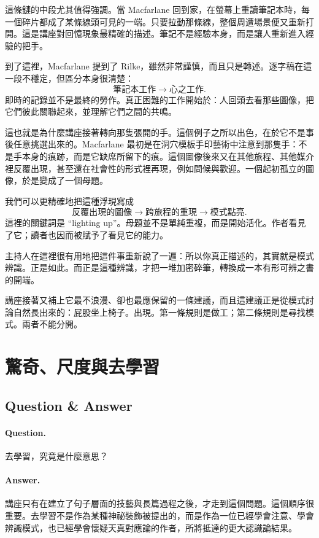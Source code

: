這條鏈的中段尤其值得強調。當 Macfarlane 回到家，在螢幕上重讀筆記本時，每一個碎片都成了某條線頭可見的一端。只要拉動那條線，整個周遭場景便又重新打開。這是講座對回憶現象最精確的描述。筆記不是經驗本身，而是讓人重新進入經驗的把手。

到了這裡，Macfarlane 提到了 Rilke，雖然非常謹慎，而且只是轉述。逐字稿在這一段不穩定，但區分本身很清楚：
\begin{equation}
\text{筆記本工作} \longrightarrow \text{心之工作}.
\end{equation}
即時的記錄並不是最終的勞作。真正困難的工作開始於：人回頭去看那些圖像，把它們彼此關聯起來，並理解它們之間的共鳴。

這也就是為什麼講座接著轉向那隻張開的手。這個例子之所以出色，在於它不是事後任意挑選出來的。Macfarlane 最初是在洞穴模板手印藝術中注意到那隻手：不是手本身的痕跡，而是它缺席所留下的痕。這個圖像後來又在其他旅程、其他媒介裡反覆出現，甚至還在社會性的形式裡再現，例如問候與歡迎。一個起初孤立的圖像，於是變成了一個母題。

我們可以更精確地把這種浮現寫成
\begin{equation}
\text{反覆出現的圖像} \longrightarrow \text{跨旅程的重現} \longrightarrow \text{模式點亮}.
\end{equation}
這裡的關鍵詞是 ``lighting up''。母題並不是單純重複，而是開始活化。作者看見了它；讀者也因而被賦予了看見它的能力。

主持人在這裡很有用地把這件事重新說了一遍：所以你真正描述的，其實就是模式辨識。正是如此。而正是這種辨識，才把一堆加密碎筆，轉換成一本有形可辨之書的開端。

講座接著又補上它最不浪漫、卻也最應保留的一條建議，而且這建議正是從模式討論自然長出來的：屁股坐上椅子。出現。第一條規則是做工；第二條規則是尋找模式。兩者不能分開。

\section{驚奇、尺度與去學習}

\subsection{Question \& Answer}

\paragraph{Question.} 去學習，究竟是什麼意思？

\paragraph{Answer.} 講座只有在建立了句子層面的技藝與長篇過程之後，才走到這個問題。這個順序很重要。去學習不是作為某種神祕裝飾被提出的，而是作為一位已經學會注意、學會辨識模式，也已經學會懷疑天真對應論的作者，所將抵達的更大認識論結果。


